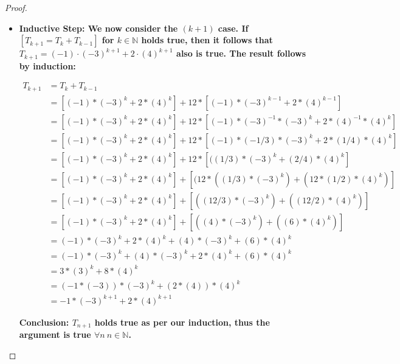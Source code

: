 \documentclass[11pt]{article}
\theoremstyle{definition}
\theoremstyle{definition}
\theoremstyle{definition}
\begin{document}
\begin{proof}
\begin{itemize}
\item \textbf{Inductive Step: We now consider the $(k+1)$ case. If $[T_{k+1} = T_k + T_{k-1}]$ for $k \in \mathbb{N}$ holds true, then it follows that $T_{k+1} = (-1) \cdot (-3)^{k+1} + 2 \cdot (4)^{k+1}$ also is true. The result follows by induction:}


\begin{align*}
T_{k+1} &= T_k + T_{k-1} \\
&= [(-1)*(-3)^{k}+2*(4)^{k}] + 12*[(-1)*(-3)^{k-1}+2*(4)^{k-1}] \\
&= [(-1)*(-3)^{k}+2*(4)^{k}] + 12*[(-1)*(-3)^{-1}*(-3)^{k}+2*(4)^{-1}*(4)^{k}] \\
&= [(-1)*(-3)^{k}+2*(4)^{k}] + 12*[(-1)*(-1/3)*(-3)^{k}+2*(1/4)*(4)^{k}] \\
&= [(-1)*(-3)^{k}+2*(4)^{k}] + 12*[((1/3)*(-3)^{k}+(2/4)*(4)^{k}] \\
&= [(-1)*(-3)^{k}+2*(4)^{k}] + [(12*((1/3)*(-3)^{k})+(12*(1/2)*(4)^{k})] \\
&= [(-1)*(-3)^{k}+2*(4)^{k}] + [((12/3)*(-3)^{k})+((12/2)*(4)^{k})] \\
&= [(-1)*(-3)^{k}+2*(4)^{k}] + [((4)*(-3)^{k})+((6)*(4)^{k})] \\
&= (-1)*(-3)^{k}+2*(4)^{k}+(4)*(-3)^{k}+(6)*(4)^{k} \\
&= (-1)*(-3)^{k}+(4)*(-3)^{k}+2*(4)^{k}+(6)*(4)^{k} \\
&= 3*(3)^{k}+8*(4)^{k} \\
&= (-1*(-3))*(-3)^{k}+(2*(4))*(4)^{k} \\
&= -1*(-3)^{k+1}+2*(4)^{k+1} 
\end{align*}

\textbf{Conclusion: $T_{n+1}$ holds true as per our induction, thus the argument is true $\forall n\ $$n \in \mathbb{N}$.}
\end{itemize}
\end{proof}



\newpage
\end{document}
